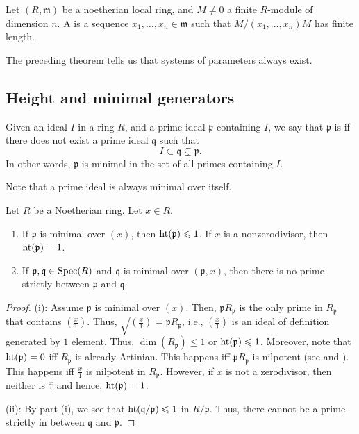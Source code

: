 \documentclass[12pt]{article}
\begin{document}
\begin{defn}
	Let $(R, \mathfrak{m})$ be a noetherian local ring, and $M \neq 0$ a finite $R$-module of dimension $n$. A  is a sequence $x_{1}, \ldots, x_{n} \in \mathfrak{m}$ such that $M/(x_{1}, \ldots, x_{n}) M$ has finite length.
\end{defn}
The preceding theorem tells us that systems of parameters always exist.

\subsection{Height and minimal generators}

\begin{defn}
	Given an ideal $I$ in a ring $R$, and a prime ideal $\mathfrak{p}$ containing $I$, we say that $\mathfrak{p}$ is  if there does not exist a prime ideal $\mathfrak{q}$ such that
	\begin{equation*} 
		I \subset \mathfrak{q} \subsetneq \mathfrak{p}.
	\end{equation*}
	In other words, $\mathfrak{p}$ is minimal in the set of all primes containing $I$.
\end{defn}
Note that a prime ideal is always minimal over itself.

\begin{prop}
	Let $R$ be a Noetherian ring. Let $x \in R$.
	\begin{enumerate}[label=(\roman*)]
		\item If $\mathfrak{p}$ is minimal over $(x)$, then $\operatorname{ht}(\mathfrak{p}) \leqslant 1$. If $x$ is a nonzerodivisor, then $\operatorname{ht}(\mathfrak{p}) = 1$.
		\item If $\mathfrak{p}, \mathfrak{q} \in \operatorname{Spec}(R)$ and $\mathfrak{q}$ is minimal over $(\mathfrak{p}, x)$, then there is no prime strictly between $\mathfrak{p}$ and $\mathfrak{q}$.
	\end{enumerate}
\end{prop}
\begin{proof} 
	(i): Assume $\mathfrak{p}$ is minimal over $(x)$. Then, $\mathfrak{p} R_{\mathfrak{p}}$ is the only prime in $R_{\mathfrak{p}}$ that contains $(\frac{x}{1})$. Thus, $\sqrt{(\frac{x}{1})} = \mathfrak{p} R_{\mathfrak{p}}$, i.e., $(\frac{x}{1})$ is an ideal of definition generated by $1$ element. Thus, $\dim(R_{\mathfrak{p}}) \le 1$ or $\operatorname{ht}(\mathfrak{p}) \leqslant 1$. \newline
	Moreover, note that $\operatorname{ht}(\mathfrak{p}) = 0$ iff $R_{\mathfrak{p}}$ is already Artinian. This happens iff $\mathfrak{p} R_{\mathfrak{p}}$ is nilpotent (see  and ). This happens iff $\frac{x}{1}$ is nilpotent in $R_{\mathfrak{p}}$. \newline
	However, if $x$ is not a zerodivisor, then neither is $\frac{x}{1}$ and hence, $\operatorname{ht}(\mathfrak{p}) = 1$. 

	(ii): By part (i), we see that $\operatorname{ht}(\mathfrak{q}/\mathfrak{p}) \leqslant 1$ in $R/\mathfrak{p}$. Thus, there cannot be a prime strictly in between $\mathfrak{q}$ and $\mathfrak{p}$.
\end{proof}
\end{document}

